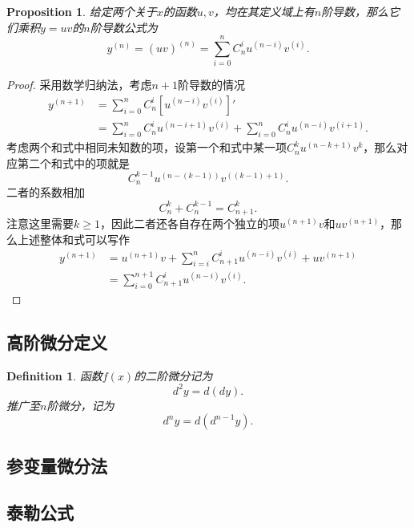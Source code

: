 \documentclass{article}
\newtheorem{proposition}[theorem]{Proposition}
\newtheorem{definition}[theorem]{Definition}
\begin{document}
\begin{proposition}
\rm 给定两个关于$x$的函数$u,v$，均在其定义域上有$n$阶导数，那么它们乘积$y=uv$的$n$阶导数公式为
$$
y^{(n)} =(uv)^{(n)} = \sum\limits_{i=0}^n C^i_n u^{(n-i)}v^{(i)}.
$$
\end{proposition}

\begin{proof}
采用数学归纳法，考虑$n+1$阶导数的情况
$$
\begin{array}{ll}
y^{(n+1)} &= \sum\limits_{i=0}^n C^i_n \left[u^{(n-i)}v^{(i)}\right]' \\
	&= \sum\limits_{i=0}^n C^i_n u^{(n-i+1)}v^{(i)} + \sum\limits_{i=0}^n C^i_n u^{(n-i)}v^{(i+1)}.
\end{array} 
$$
考虑两个和式中相同未知数的项，设第一个和式中某一项$C^k_n u^{(n-k+1)}v^{k}$，那么对应第二个和式中的项就是
$$
C^{k-1}_n u^{(n-(k-1))}v^{((k-1)+1)}.
$$
二者的系数相加
$$
C^k_n + C^{k-1}_n = C^k_{n+1}.
$$
注意这里需要$k\geq 1$，因此二者还各自存在两个独立的项$u^{(n+1)}v$和$uv^{(n+1)}$，那么上述整体和式可以写作
$$
\begin{array}{ll}
y^{(n+1)} &= u^{(n+1)}v + \sum\limits_{i=i}^{n} C^i_{n+1} u^{(n-i)}v^{(i)} + uv^{(n+1)} \\
& = \sum\limits_{i=0}^{n+1} C^i_{n+1} u^{(n-i)}v^{(i)}.
\end{array}
$$
\end{proof}

\subsection{高阶微分定义}

\begin{definition}
\rm 函数$f(x)$的二阶微分记为
$$
d^2y = d(dy).
$$
推广至$n$阶微分，记为
$$
d^ny = d(d^{n-1}y).
$$
\end{definition}

\subsection{参变量微分法}

\newpage
\subsection{泰勒公式}
\end{document}
